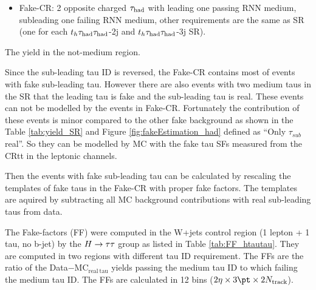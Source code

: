 \begin{itemize}
\item{Fake-CR: 2 opposite charged $\tau_\text{had}$ with leading one passing RNN medium, subleading one failing RNN medium, other requirements are the same as SR (one for each  $t_h\tau_\text{had}{}\tau_\text{had}$-2j and $t_h\tau_\text{had}{}\tau_\text{had}$-3j SR).}
\end{itemize}

\begin{table}
\caption{The yield in the not-medium region.}
\label{tab:hadronic_nm_yield}

\end{table}

Since the sub-leading tau ID is reversed, the Fake-CR contains most of events with fake sub-leading tau.
However there are also events with two medium taus in the SR that the leading tau is fake and the sub-leading tau is real.
These events can not be modelled by the events in Fake-CR. Fortunately the contribution of these events is minor compared to the other fake background as shown in the Table \ref{tab:yield_SR} and Figure \ref{fig:fakeEstimation_had} defined as ``Only $\tau_{sub}$ real''. So they can be modelled by MC with the fake tau SFs measured from the
CRtt in the leptonic channels.

Then the events with fake sub-leading tau can be calculated by rescaling the templates of fake taus in the Fake-CR with proper fake factors. The templates are aquired by subtracting all MC background contributions with real sub-leading taus from data.

The Fake-factors (FF) were computed in the W+jets control region (1 lepton + 1 tau, no b-jet) by the $H \rightarrow \tau\tau$ group \cite{Htautau-note} as listed in Table \ref{tab:FF_htautau}. They are computed in two regions with different tau ID requirement. The FFs are the ratio of the Data$-$MC$_\mathrm{real~tau}$ yields passing the medium tau ID to which failing the medium tau ID. The FFs are calculated in 12 bins ($2\eta\times3\pt\times2N_\mathrm{track}$).

